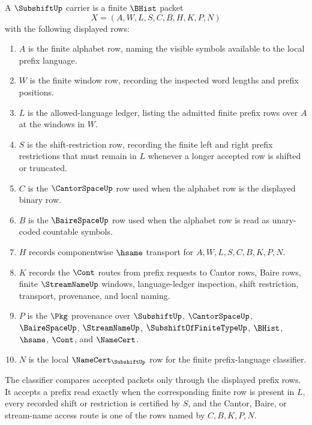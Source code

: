 \begin{definition}
\label{def:subshift-carrier}
A $\SubshiftUp$ carrier is a finite $\BHist$ packet
$$
X=(A,W,L,S,C,B,H,K,P,N)
$$
with the following displayed rows:
\begin{enumerate}
\item $A$ is the finite alphabet row, naming the visible symbols available to the local prefix language.
\item $W$ is the finite window row, recording the inspected word lengths and prefix positions.
\item $L$ is the allowed-language ledger, listing the admitted finite prefix rows over $A$ at the windows in $W$.
\item $S$ is the shift-restriction row, recording the finite left and right prefix restrictions that must remain in $L$ whenever a longer accepted row is shifted or truncated.
\item $C$ is the $\CantorSpaceUp$ row used when the alphabet row is the displayed binary row.
\item $B$ is the $\BaireSpaceUp$ row used when the alphabet row is read as unary-coded countable symbols.
\item $H$ records componentwise $\hsame$ transport for $A,W,L,S,C,B,K,P,N$.
\item $K$ records the $\Cont$ routes from prefix requests to Cantor rows, Baire rows, finite $\StreamNameUp$ windows, language-ledger inspection, shift restriction, transport, provenance, and local naming.
\item $P$ is the $\Pkg$ provenance over $\SubshiftUp$, $\CantorSpaceUp$, $\BaireSpaceUp$, $\StreamNameUp$, $\SubshiftOfFiniteTypeUp$, $\BHist$, $\hsame$, $\Cont$, and $\NameCert$.
\item $N$ is the local $\NameCert_{\SubshiftUp}$ row for the finite prefix-language classifier.
\end{enumerate}
The classifier compares accepted packets only through the displayed prefix rows. It accepts a prefix read exactly when the corresponding finite row is present in $L$, every recorded shift or restriction is certified by $S$, and the Cantor, Baire, or stream-name access route is one of the rows named by $C,B,K,P,N$.
\end{definition}

